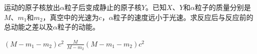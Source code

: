 运动的原子核放出\(\alpha\)粒子后变成静止的原子核\(Y\)。已知\(X\)、\(Y\)和\(\alpha\)粒子的质量分别是\(M\)、\(m_1\)和\(m_2\)，真空中的光速为\(c\)，\(\alpha\)粒子的速度远小于光速。求反应后与反应前的总动能之差以及\(\alpha\)粒子的动能。
\begin{answer}
    \((M - m_1 - m_2)c^2\) \quad \(\frac{M}{M - m_2}(M - m_1 - m_2)c^2\)
\end{answer}